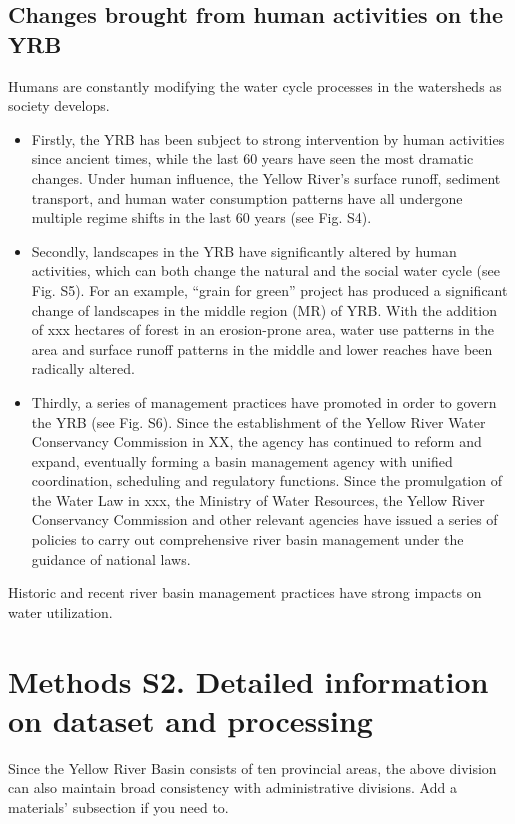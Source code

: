 \documentclass[9pt,twoside,lineno]{pnas-new}
\begin{document}

\subsection*{Changes brought from human activities on the YRB}
Humans are constantly modifying the water cycle processes in the watersheds as society develops.
\begin{itemize}
    \item Firstly, the YRB has been subject to strong intervention by human activities since ancient times, while the last 60 years have seen the most dramatic changes. Under human influence, the Yellow River's surface runoff, sediment transport, and human water consumption patterns have all undergone multiple regime shifts in the last 60 years (see Fig. S4). 
    \item Secondly, landscapes in the YRB have significantly altered by human activities, which can both change the natural and the social water cycle (see Fig. S5). For an example, “grain for green” project has produced a significant change of landscapes in the middle region (MR) of YRB. With the addition of xxx hectares of forest in an erosion-prone area, water use patterns in the area and surface runoff patterns in the middle and lower reaches have been radically altered.
    \item Thirdly, a series of management practices have promoted in order to govern the YRB (see Fig. S6). Since the establishment of the Yellow River Water Conservancy Commission in XX, the agency has continued to reform and expand, eventually forming a basin management agency with unified coordination, scheduling and regulatory functions. Since the promulgation of the Water Law in xxx, the Ministry of Water Resources, the Yellow River Conservancy Commission and other relevant agencies have issued a series of policies to carry out comprehensive river basin management under the guidance of national laws.
\end{itemize}
Historic and recent river basin management practices have strong impacts on water utilization.


\section*{Methods S2. Detailed information on dataset and processing}
Since the Yellow River Basin consists of ten provincial areas, the above division can also maintain broad consistency with administrative divisions.
Add a materials' subsection if you need to.
\end{document}
